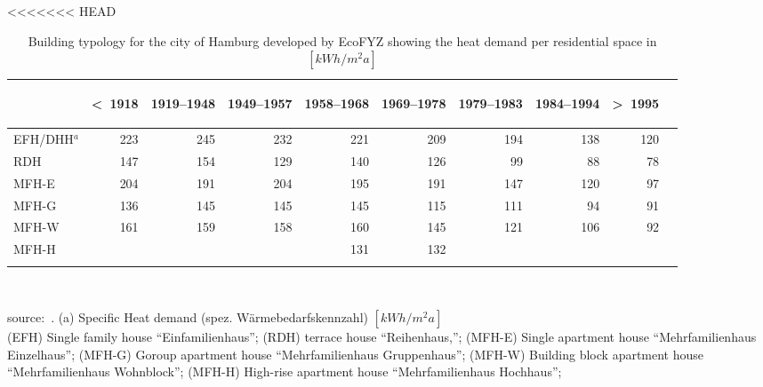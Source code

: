 <<<<<<< HEAD
\begin{table}[htbp]
  \centering
  \caption{Building typology for the city of Hamburg developed by EcoFYZ
      showing the heat demand per residential space in
  $[kWh/m^2a]$}\label{tab:EcoFYZ}%
  \begin{tabular}{l r rrr rrr rr}
    \addlinespace
    \toprule
    &
    \begin{sideways}\textless~1918\end{sideways}&  %
    \begin{sideways}1919--1948\end{sideways}&     %
    \begin{sideways}1949--1957\end{sideways}&     %
    \begin{sideways}1958--1968\end{sideways}&     %
    \begin{sideways}1969--1978\end{sideways}&     %
    \begin{sideways}1979--1983\end{sideways}&     %
    \begin{sideways}1984--1994\end{sideways}&     %
    \begin{sideways}\textgreater~1995\end{sideways}\\    %
    \midrule
EFH/DHH$^a$  &223 & 245 & 232& 221& 209& 194& 138& 120\\
RDH          &147 & 154 & 129& 140& 126& 99 & 88 & 78\\
MFH-E        &204 & 191 & 204& 195& 191& 147& 120& 97\\
MFH-G        &136 & 145 & 145& 145& 115& 111& 94 & 91\\
MFH-W  	  &161 & 159 & 158& 160& 145& 121& 106& 92\\
MFH-H        &    &     &    & 131& 132\\
    \bottomrule
    \addlinespace
    \end{tabular}\\
    \begin{footnotesize}
        source:~\cite[pp.~18]{Hermelink.2011}.
    (a) Specific Heat demand (spez. W\"armebedarfskennzahl)
    $[kWh/m^{2}a]$\\
(EFH) Single family house ``Einfamilienhaus'';
(RDH) terrace house ``Reihenhaus,'';
(MFH-E) Single apartment house ``Mehrfamilienhaus Einzelhaus'';
(MFH-G) Goroup apartment house ``Mehrfamilienhaus Gruppenhaus'';
(MFH-W) Building block apartment house ``Mehrfamilienhaus Wohnblock'';
(MFH-H) High-rise apartment house ``Mehrfamilienhaus Hochhaus'';
    \end{footnotesize}
\end{table}
